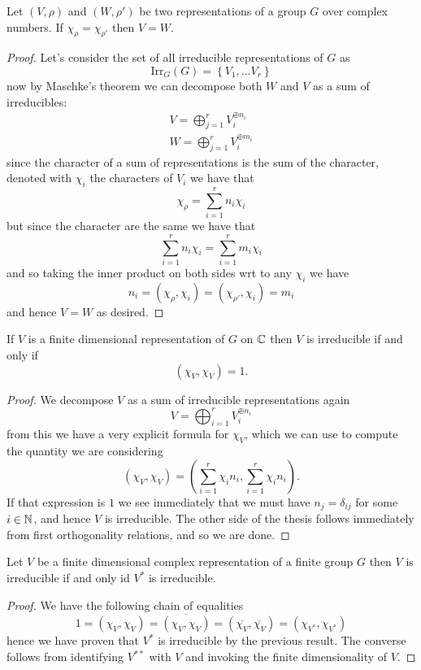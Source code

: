 \documentclass[11pt]{scrartcl}
\begin{document}
	\begin{proposition}
		Let $(V,\rho)$ and $(W,\rho')$ be two representations of a group $G$ over complex numbers. If $\chi_\rho = \chi_{\rho'}$ then $V=W$.
	\end{proposition}
	\begin{proof}
		Let's consider the set of all irreducible representations of $G$ as
		$$\text{Irr}_G(G)=\left\{V_1,\dots V_r\right\}$$
		now by Maschke's theorem we can decompose both $W$ and $V$ as a sum of irreducibles:
		\begin{gather*}
			V=\bigoplus_{j=1}^rV_i^{\oplus n_i} \\
			W=\bigoplus_{j=1}^rV_i^{\oplus m_i}
		\end{gather*}
		since the character of a sum of representations is the sum of the character, denoted with $\chi_i$ the characters of $V_i$ we have that
		$$\chi_\rho = \sum_{i=1}^r n_i\chi_i$$
		but since the character are the same we have that
		$$\sum_{i=1}^r n_i\chi_i=\sum_{i=1}^r m_i\chi_i$$
		and so taking the inner product on both sides wrt to any $\chi_i$ we have
		$$n_i=\left(\chi_\rho,\chi_i\right)=\left(\chi_{\rho'},\chi_i\right)=m_i$$
		and hence $V=W$ as desired.
	\end{proof}
	\begin{corollary}
		If $V$ is a finite dimensional representation of $G$ on $\mathbb C$ then $V$ is irreducible if and only if 
		$$(\chi_V,\chi_V)=1.$$
	\end{corollary}
	\begin{proof}
		We decompose $V$ as a sum of irreducible representations again
		$$V=\bigoplus_{i=1}^r V_i^{\oplus n_i}$$
		from this we have a very explicit formula for $\chi_V$, which we can use to compute the quantity we are considering
		$$\left(\chi_V,\chi_V\right)=\left(\sum_{i=1}^r \chi_in_i,\sum_{i=1}^r \chi_in_i\right).$$
		If that expression is $1$ we see immediately that we must have $n_j=\delta_{ij}$ for some $i\in \mathbb N$, and hence $V$ is irreducible. The other side of the thesis follows immediately from first orthogonality relations, and so we are done.
	\end{proof}
	\begin{corollary}
		Let $V$ be a finite dimensional complex representation of a finite group $G$ then $V$ is irreducible if and only id $V^*$ is irreducible.
	\end{corollary}
	\begin{proof}
		We have the following chain of equalities
		$$1=\left(\chi_V,\chi_V\right)=\overline{\left(\chi_V,\chi_V\right)}=\left(\overline{\chi_V},\overline{\chi_V}\right)=\left(\chi_{V^*},\chi_{V^*}\right)$$
		hence we have proven that $V^*$ is irreducible by the previous result. The converse follows from identifying $V^{**}$ with $V$ and invoking the finite dimensionality of $V$.
	\end{proof}
\end{document}
